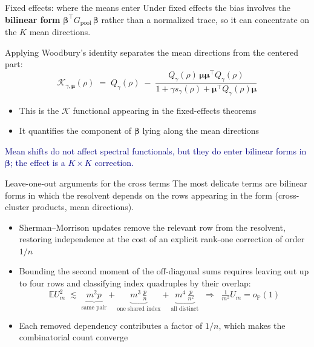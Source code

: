 \documentclass[aspectratio=169,11pt]{beamer}
\newcommand{\takeaway}[1]{%
  \vfill
  {\centering\colorbox{navy!8}{\parbox{0.92\textwidth}{\centering\small\textcolor{navy}{#1}}}\par}}
\newcommand{\E}{\mathbb{E}}
\newcommand{\bbeta}{\bm{\beta}}
\newcommand{\bmu}{\bm{\mu}}
\begin{document}
\begin{frame}{Fixed effects: where the means enter}
  Under fixed effects the bias involves the \textbf{bilinear form} $\bbeta^\top G_{\mathrm{pool}}\,\bbeta$ rather than a normalized trace, so it can concentrate on the $K$ mean directions.
  \vspace{1mm}

  Applying Woodbury's identity separates the mean directions from the centered part:
  \[
    \mathcal{K}_{\gamma,\bmu}(\rho) \;=\; Q_\gamma(\rho)\;-\;
    \frac{Q_\gamma(\rho)\,\bmu\bmu^\top Q_\gamma(\rho)}{1 + \gamma s_\gamma(\rho) + \bmu^\top Q_\gamma(\rho)\bmu}
  \]
  \begin{itemize}
    \item This is the $\mathcal{K}$ functional appearing in the fixed-effects theorems
    \item It quantifies the component of $\bbeta$ lying along the mean directions
  \end{itemize}
  \takeaway{Mean shifts do not affect spectral functionals, but they do enter bilinear forms in $\bbeta$; the effect is a $K \times K$ correction.}
\end{frame}

\begin{frame}{Leave-one-out arguments for the cross terms}
  The most delicate terms are bilinear forms in which the resolvent depends on the rows appearing in the form (cross-cluster products, mean directions).
  \begin{itemize}
    \item Sherman--Morrison updates remove the relevant row from the resolvent, restoring independence at the cost of an explicit rank-one correction of order $1/n$
    \item Bounding the second moment of the off-diagonal sums requires leaving out up to four rows and classifying index quadruples by their overlap:
    \[
      \E U_m^2 \;\lesssim\; \underbrace{m^2 p}_{\text{same pair}} + \underbrace{m^3\,\tfrac{p}{n}}_{\text{one shared index}} + \underbrace{m^4\,\tfrac{p}{n^2}}_{\text{all distinct}}
      \;\;\Rightarrow\;\; \tfrac{1}{m^2}U_m = o_{\mathbb{P}}(1)
    \]
    \item Each removed dependency contributes a factor of $1/n$, which makes the combinatorial count converge
  \end{itemize}
\end{frame}
\end{document}

